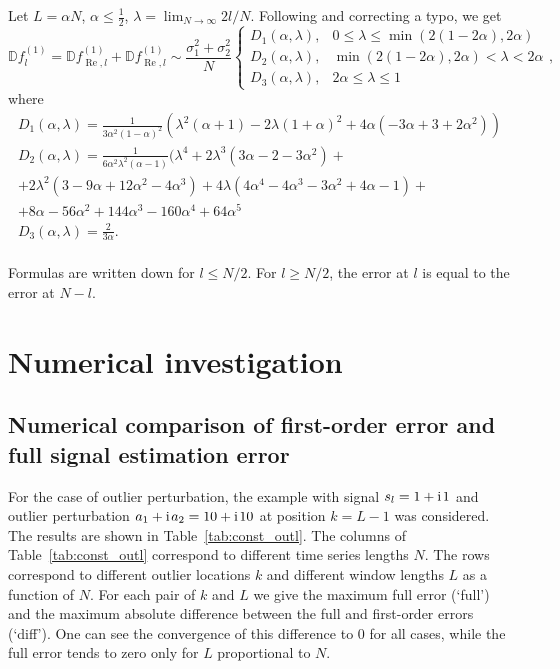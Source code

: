 \documentclass[engproc, submit, article,pdftex,moreauthors]{Definitions/mdpi}
\newcommand{\iu}{\mathrm{i}\mkern2mu}
\renewcommand{\Re}{\operatorname{Re}}
\begin{document}
Let $L = \alpha N$, $\alpha \leq \frac{1}{2}$, $\lambda = \lim_{N\to\infty} 2 l / N$. Following \cite{Golyandina.Vlassieva2009} and correcting a typo, we get
\begin{equation}
\label{eq:const_noise}
\mathbb{D} f^{(1)}_l = \mathbb{D} f^{(1)}_{\Re, l} + \mathbb{D} f^{(1)}_{\Re, l} \sim \frac{\sigma^2_1 + \sigma^2_2}{N}
\begin{cases}
	D_1(\alpha, \lambda), &\text{$0 \leq \lambda \leq \min(2 (1 - 2\alpha), 2\alpha)$}\\
	D_2(\alpha, \lambda), &\text{$\min(2 (1 - 2\alpha), 2\alpha) < \lambda < 2\alpha$}\\
	D_3(\alpha, \lambda), &\text{$2\alpha \leq \lambda \leq 1$}
\end{cases},
\end{equation}
where
\begin{gather*}
	D_1(\alpha, \lambda) = \frac{1}{3 \alpha^2(1 - \alpha)^2} (\lambda^2(\alpha + 1) - 2\lambda(1 + \alpha)^2 + 4 \alpha(-3\alpha + 3 + 2\alpha^2))\\
	D_2(\alpha, \lambda) = \frac{1}{6 \alpha^2\lambda^2 (\alpha - 1)} (\lambda^4 + 2\lambda^3(3\alpha -2 -3\alpha^2) + \\
	+ 2\lambda^2(3 - 9\alpha + 12\alpha^2 - 4\alpha^3) + 4\lambda(4 \alpha^4 - 4\alpha^3 - 3\alpha^2 + 4\alpha - 1) +\\
	+ 8\alpha - 56 \alpha^2 + 144\alpha^3 - 160\alpha^4 + 64\alpha^5\\
	D_3(\alpha, \lambda) = \frac{2}{3\alpha}.\\
\end{gather*}

Formulas are written down for $l\le N/2$. For $l\ge N/2$, the error  at $l$ is equal to the error at $N-l$.

\section{Numerical investigation}
\subsection{Numerical comparison of first-order error and full signal estimation error}
\label{sec:results}

For the case of outlier perturbation, the example with signal $s_l = 1 + \iu 1$ and outlier perturbation $a_1 + \iu a_2 = 10 + \iu 10$ at position $k = L - 1$ was considered. The results are shown in Table~\ref{tab:const_outl}. The columns of Table~\ref{tab:const_outl} correspond to different time series lengths $N$. The rows correspond to different outlier locations $k$ and different window lengths $L$ as a function of $N$. For each pair of $k$ and $L$ we give the maximum full error (`full') and the maximum absolute difference between the full and first-order errors (`diff'). One can see the convergence of this difference to 0 for all cases, while the full error tends to zero only for $L$ proportional to $N$.
\end{document}
